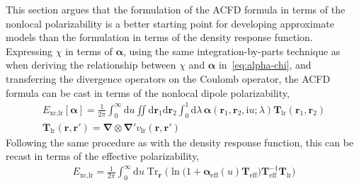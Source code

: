 This section argues that the formulation of the ACFD formula in terms of the nonlocal polarizability is a better starting point for developing approximate models than the formulation in terms of the density response function.
Expressing $\chi$ in terms of $\boldsymbol\alpha$, using the same integration-by-parts technique as when deriving the relationship between $\chi$ and $\boldsymbol\alpha$ in~\eqref{eq:alpha-chi}, and transferring the divergence operators on the Coulomb operator, the ACFD formula can be cast in terms of the nonlocal dipole polarizability,
\begin{equation}
\begin{gathered}
  E_\text{xc,lr}[\boldsymbol\alpha]=\frac1{2\pi}\int_0^\infty\mathrm du\iint\mathrm d\mathbf r_1\mathrm d\mathbf r_2\int_0^1\mathrm d\lambda\,\boldsymbol\alpha(\mathbf r_1,\mathbf r_2,\mathrm iu;\lambda)\mathbf T_\text{lr}(\mathbf r_1,\mathbf r_2) \\
  \mathbf T_\text{lr}(\mathbf r,\mathbf r')=\boldsymbol\nabla\otimes\boldsymbol\nabla' v_\text{lr}(\mathbf r,\mathbf r')
\end{gathered}
\end{equation}
Following the same procedure as with the density response function, this can be recast in terms of the effective polarizability,
\begin{equation}
\begin{aligned}
  E_\text{xc,lr}=\frac1{2\pi}\int_0^\infty\mathrm du\operatorname{Tr}_{\mathbf r}\Big(\ln\big(1+\boldsymbol\alpha_\text{eff}(u)\mathbf T_\text{eff}\big)\mathbf T_\text{eff}^{-1}\mathbf T_\text{lr}\Big)
\end{aligned}
  \label{eq:acfd-vdw}
\end{equation}


